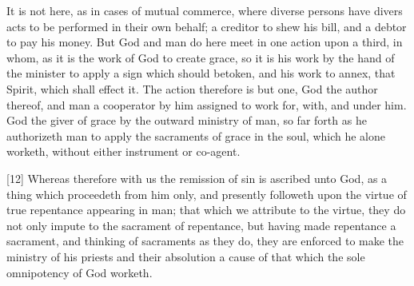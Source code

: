 It is not here, as in cases of mutual commerce, where diverse persons have divers acts to be performed in their own behalf; a creditor to shew his bill, and a debtor to pay his money. But God and man do here meet in one action upon a third, in whom, as it is the work of God to create grace, so it is his work by the hand of the minister to apply a sign which should betoken, and his work to annex, that Spirit, which shall effect it. The action therefore is but one, God the author thereof, and man a cooperator by him assigned to work for, with, and under him. God the giver of grace by the outward ministry of man, so far forth as he authorizeth man to apply the sacraments of grace in the soul, which he alone worketh, without either instrument or co-agent.

[12] Whereas therefore with us the remission of sin is ascribed unto God, as a thing which proceedeth from him only, and presently followeth upon the virtue of true repentance appearing in man; that which we attribute to the virtue,  they do not only impute to the sacrament of repentance, but having made repentance a sacrament, and thinking of sacraments as they do, they are enforced to make the ministry of his priests and their absolution a cause of that which the sole omnipotency of God worketh.

